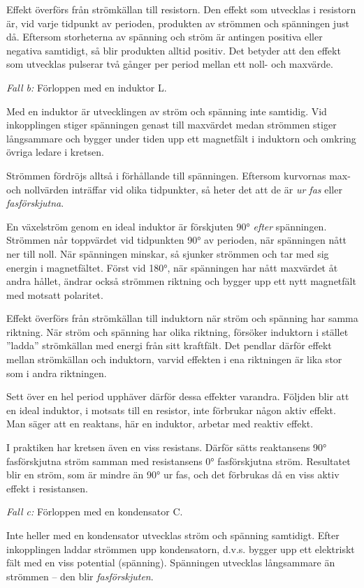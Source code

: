 Effekt överförs från strömkällan till resistorn. Den effekt som utvecklas i
resistorn är, vid varje tidpunkt av perioden, produkten av strömmen och
spänningen just då. Eftersom storheterna av spänning och ström är antingen
positiva eller negativa samtidigt, så blir produkten alltid positiv. Det betyder
att den effekt som utvecklas pulserar två gånger per period mellan ett noll- och
maxvärde.

\emph{Fall b:} Förloppen med en induktor L.

Med en induktor är utvecklingen av ström och spänning inte samtidig. Vid
inkopplingen stiger spänningen genast till maxvärdet medan strömmen stiger
långsammare och bygger under tiden upp ett magnetfält i induktorn och omkring
övriga ledare i kretsen.

Strömmen fördröjs alltså i förhållande till spänningen. Eftersom kurvornas max-
och nollvärden inträffar vid olika tidpunkter, så heter det att de är
\emph{ur fas} eller \emph{fasförskjutna}.

En växelström genom en ideal induktor är förskjuten 90° \emph{efter}
spänningen. Strömmen når toppvärdet vid tidpunkten 90° av perioden, när
spänningen nått ner till noll. När spänningen minskar, så sjunker strömmen och
tar med sig energin i magnetfältet. Först vid 180°, när spänningen har nått
maxvärdet åt andra hållet, ändrar också strömmen riktning och bygger upp ett
nytt magnetfält med motsatt polaritet.

Effekt överförs från strömkällan till induktorn när ström och spänning har samma
riktning. När ström och spänning har olika riktning, försöker induktorn i
stället ''ladda'' strömkällan med energi från sitt kraftfält. Det pendlar därför
effekt mellan strömkällan och induktorn, varvid effekten i ena riktningen är
lika stor som i andra riktningen.

Sett över en hel period upphäver därför dessa effekter varandra. Följden blir
att en ideal induktor, i motsats till en resistor, inte förbrukar någon aktiv
effekt. Man säger att en reaktans, här en induktor, arbetar med reaktiv effekt.

I praktiken har kretsen även en viss resistans. Därför sätts reaktansens 90°
fasförskjutna ström samman med resistansens 0° fasförskjutna ström. Resultatet
blir en ström, som är mindre än 90° ur fas, och det förbrukas då en viss aktiv
effekt i resistansen.


\emph{Fall c:} Förloppen med en kondensator C.

Inte heller med en kondensator utvecklas ström och spänning samtidigt. Efter
inkopplingen laddar strömmen upp kondensatorn, d.v.s. bygger upp ett elektriskt
fält med en viss potential (spänning). Spänningen utvecklas långsammare än
strömmen -- den blir \emph{fasförskjuten}.

